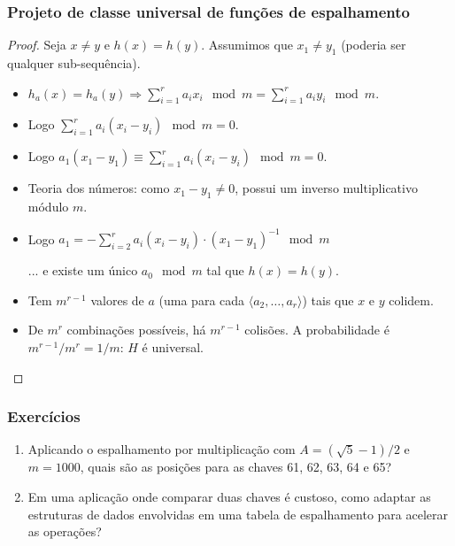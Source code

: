 \documentclass{beamer}
\begin{document}
\begin{frame}

\frametitle{Projeto de classe universal de funções de espalhamento}

\begin{proof}

Seja $x \neq y$ e $h(x) = h(y)$. Assumimos que $x_1 \neq y_1$ (poderia ser qualquer sub-sequência).

\begin{itemize}

\item $h_{a}(x) = h_{a}(y) \Longrightarrow \sum_{i=1}^{r} a_i x_i \mod m = \sum_{i=1}^{r} a_i y_i \mod m$.

\item Logo $\sum_{i=1}^{r} a_i (x_i - y_i) \mod m = 0$.

\item Logo $a_1(x_1 - y_1) \equiv \sum_{i=1}^{r} a_i (x_i - y_i) \mod m = 0$.

\item Teoria dos números: como $x_1 - y_1 \neq 0$, possui um inverso multiplicativo módulo $m$.

\item Logo $a_1 = - \sum_{i=2}^r a_i (x_i - y_i) \cdot (x_1 - y_1)^{-1} \mod m$

... e existe um único $a_0 \mod m$ tal que $h(x) = h(y)$.

\item Tem $m^{r-1}$ valores de $a$ (uma para cada $\langle a_2, \ldots, a_r \rangle$) tais que $x$ e $y$ colidem.

\item De $m^r$ combinações possíveis, há $m^{r-1}$ colisões. A probabilidade é
  $m^{r-1}/m^r = 1/m$: $H$ é universal.

\end{itemize}

\end{proof}

\end{frame}

\begin{frame}

\frametitle{Exercícios}

\begin{enumerate}

\item Aplicando o espalhamento por multiplicação com $A = (\sqrt{5} - 1)/2$ e $m
  = 1000$, quais são as posições para as chaves 61, 62, 63, 64 e 65?

\item Em uma aplicação onde comparar duas chaves é custoso, como adaptar as estruturas de dados
  envolvidas em uma tabela de espalhamento para acelerar as operações?

\end{enumerate}

\end{frame}
\end{document}
